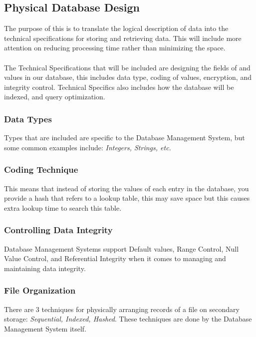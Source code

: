 \documentclass[12pt]{article}
\begin{document}
\subsection{Physical Database Design}

The purpose of this is to translate the logical description of data into the technical specifications for storing and retrieving data. This will include more attention on reducing processing time rather than minimizing the space.\\
\\
The Technical Specifications that will be included are designing the fields of and values in our database, this includes data type, coding of values, encryption, and integrity control. Technical Specifics also includes how the database will be indexed, and query optimization.

\subsubsection{Data Types}
Types that are included are specific to the Database Management System, but some common examples include: \textit{Integers, Strings, etc.}

\subsubsection{Coding Technique}

This means that instead of storing the values of each entry in the database, you provide a hash that refers to a lookup table, this may save space but this causes extra lookup time to search this table.

\subsubsection{Controlling Data Integrity}

Database Management Systems support Default values, Range Control, Null Value Control, and Referential Integrity when it comes to managing and maintaining data integrity.

\subsubsection{File Organization}

There are 3 techniques for physically arranging records of a file on secondary storage: \textit{Sequential, Indexed, Hashed}. These techniques are done by the Database Management System itself.
\end{document}
